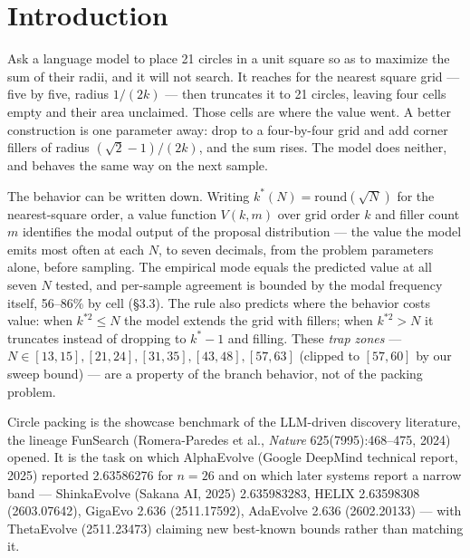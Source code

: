 \documentclass[11pt]{article}
\begin{document}
\section{Introduction}

Ask a language model to place 21 circles in a unit square so as to maximize the sum of their
radii, and it will not search. It reaches for the nearest square grid --- five by five, radius
$1/(2k)$ --- then truncates it to 21 circles, leaving four cells empty and their area unclaimed.
Those cells are where the value went. A better construction is one parameter away: drop to a
four-by-four grid and add corner fillers of radius $(\sqrt{2}-1)/(2k)$, and the sum rises. The model
does neither, and behaves the same way on the next sample.

The behavior can be written down. Writing $k^{*}(N) = \mathrm{round}(\sqrt{N})$ for the nearest-square order, a
value function $V(k, m)$ over grid order $k$ and filler count $m$ identifies the modal output of the
proposal distribution --- the value the model emits most often at each $N$, to seven decimals, from
the problem parameters alone, before sampling. The empirical mode equals the predicted value at
all seven $N$ tested, and per-sample agreement is bounded by the modal frequency itself, 56--86\%
by cell (\S3.3). The rule also predicts where the behavior costs value: when $k^{*2} \le N$ the model
extends the grid with fillers; when $k^{*2} > N$ it truncates instead of dropping to $k^{*}-1$ and
filling. These \textit{trap zones} --- $N \in [13,15], [21,24], [31,35], [43,48], [57,63]$ (clipped to
$[57,60]$ by our sweep bound) --- are a property of the branch behavior, not of the packing problem.

Circle packing is the showcase benchmark of the LLM-driven discovery literature, the lineage
FunSearch (Romera-Paredes et al., \textit{Nature} 625(7995):468--475, 2024) opened. It is the task on
which AlphaEvolve (Google DeepMind technical report, 2025) reported 2.63586276 for $n = 26$ and
on which later systems report a narrow band --- ShinkaEvolve (Sakana AI, 2025) 2.635983283, HELIX
2.63598308 (2603.07642), GigaEvo 2.636 (2511.17592), AdaEvolve 2.636 (2602.20133) --- with
ThetaEvolve (2511.23473) claiming new best-known bounds rather than matching it.
\end{document}
